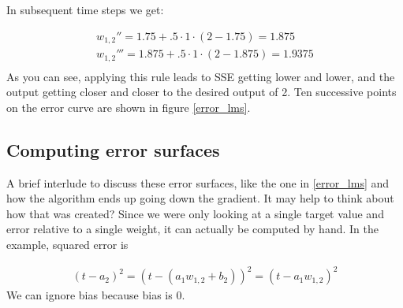In subsequent time steps we get:

\begin{eqnarray*}
w_{1,2}'' = 1.75 + .5 \cdot 1 \cdot (2 - 1.75) = 1.875 \\
w_{1,2}''' = 1.875 + .5 \cdot 1 \cdot (2 - 1.875) = 1. 9375 \\
\end{eqnarray*}
As you can see, applying this rule leads to SSE getting lower and lower, and the output getting closer and closer to the desired output of 2. Ten successive points on the error curve are shown in figure \ref{error_lms}.

%
%
%
%

\subsection{Computing error surfaces}

A brief interlude to discuss these error surfaces, like the one in \ref{error_lms} and how the algorithm ends up going down the gradient. It may help to think about how that was created? Since we were only looking at a single target value and error relative to a single weight, it can actually be computed by hand. In the example, squared error is

\begin{eqnarray*}
(t - a_2)^2 =  (t - (a_1 w_{1,2} + b_2))^2 = (t - a_1 w_{1,2})^2  
\end{eqnarray*}
We can ignore bias because bias is 0.

